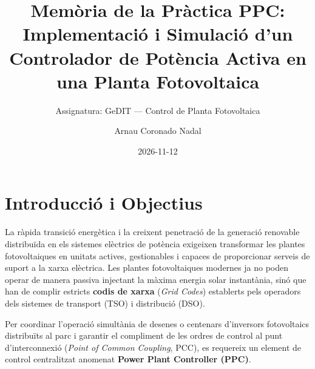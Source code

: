 \documentclass[
  catalan,
  letterpaper,
  DIV=11,
  numbers=noendperiod]{scrartcl}
\title{Memòria de la Pràctica PPC: Implementació i Simulació d'un
Controlador de Potència Activa en una Planta Fotovoltaica}
\subtitle{Assignatura: GeDIT --- Control de Planta Fotovoltaica}
\author{Arnau Coronado Nadal}
\date{2026-11-12}
\renewcommand*\contentsname{Taula de continguts}
\newcommand\contentsname{Taula de continguts}
\begin{document}
\maketitle

\renewcommand*\contentsname{Taula de continguts}
{
\setcounter{tocdepth}{3}
\tableofcontents
}

\section{Introducció i Objectius}\label{introducciuxf3-i-objectius}

La ràpida transició energètica i la creixent penetració de la generació
renovable distribuïda en els sistemes elèctrics de potència exigeixen
transformar les plantes fotovoltaiques en unitats actives, gestionables
i capaces de proporcionar serveis de suport a la xarxa elèctrica. Les
plantes fotovoltaiques modernes ja no poden operar de manera passiva
injectant la màxima energia solar instantània, sinó que han de complir
estricts \textbf{codis de xarxa} (\emph{Grid Codes}) establerts pels
operadors dels sistemes de transport (TSO) i distribució (DSO).

Per coordinar l'operació simultània de desenes o centenars d'inversors
fotovoltaics distribuïts al parc i garantir el compliment de les ordres
de control al punt d'interconnexió (\emph{Point of Common Coupling},
PCC), es requereix un element de control centralitzat anomenat
\textbf{Power Plant Controller (PPC)}.
\end{document}
